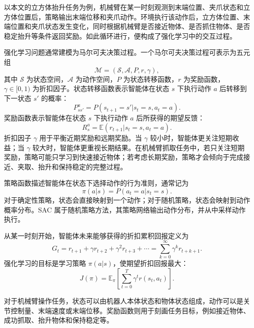 \documentclass[
    type = bachelor,
    oneside,
    fontset = fandol
]{njuthesis}
\begin{document}
以本文的立方体抬升任务为例，机械臂在某一时刻观测到末端位置、夹爪状态和立方体位置后，策略输出末端位移和夹爪动作。环境执行该动作后，立方体位置、末端位置和夹爪状态发生变化，同时根据机械臂是否接近物体、是否抓住物体、是否稳定抬升等条件返回奖励。如此循环进行，便构成了强化学习中的交互过程。


强化学习问题通常建模为马尔可夫决策过程。一个马尔可夫决策过程可表示为五元组
\begin{equation}
  \mathcal{M} = (\mathcal{S}, \mathcal{A}, P, r, \gamma),
\end{equation}
其中 $\mathcal{S}$ 为状态空间，$\mathcal{A}$ 为动作空间，$P$ 为状态转移函数，$r$ 为奖励函数，$\gamma \in [0,1)$ 为折扣因子。状态转移函数表示智能体在状态 $s$ 下执行动作 $a$ 后转移到下一状态 $s'$ 的概率：
\begin{equation}
  P_{ss'}^{a}=P(s_{t+1}=s'|s_t=s,a_t=a).
\end{equation}
奖励函数表示智能体在状态 $s$ 下执行动作 $a$ 后所获得的期望反馈：
\begin{equation}
  R_s^a=\mathbb{E}(r_{t+1}|s_t=s,a_t=a).
\end{equation}
折扣因子 $\gamma$ 用于平衡近期奖励和远期奖励。当 $\gamma$ 较小时，智能体更关注短期收益；当 $\gamma$ 较大时，智能体更重视长期结果。在机械臂抓取任务中，若只关注短期奖励，策略可能只学习到快速接近物体；若考虑长期奖励，策略才会倾向于完成接近、夹取、抬升和保持稳定的完整过程。

策略函数描述智能体在状态下选择动作的行为准则，通常记为
\begin{equation}
  \pi(a|s)=P(a_t=a|s_t=s).
\end{equation}
对于确定性策略，状态会直接映射到一个动作；对于随机策略，状态会映射到动作概率分布。SAC 属于随机策略方法，其策略网络输出动作分布，并从中采样动作执行。

从某一时刻开始，智能体未来能够获得的折扣累积回报定义为
\begin{equation}
  G_t=r_{t+1}+\gamma r_{t+2}+\gamma^2 r_{t+3}+\cdots
  =\sum_{k=0}^{\infty}\gamma^k r_{t+k+1}.
\end{equation}
强化学习的目标是学习策略 $\pi(a|s)$，使期望折扣回报最大：
\begin{equation}
  J(\pi)=\mathbb{E}_{\pi}\left[\sum_{t=0}^{T}\gamma^t r(s_t,a_t)\right].
\end{equation}

对于机械臂操作任务，状态可以由机器人本体状态和物体状态组成，动作可以是关节控制量、末端速度或末端位移。奖励函数则用于刻画任务目标，例如接近物体、成功抓取、抬升物体和保持稳定等。
\end{document}
